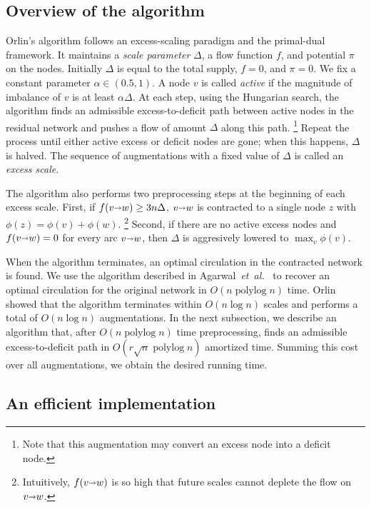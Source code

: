 \documentclass[a4paper,UKenglish]{socg-lipics-v2019}
\makeatletter
\def\etal{\emph{et~al.}}
\def\etal{\textit{et~al.}}
\def\polylog{\mathop{\mathrm{polylog}}}
\def\fsupply{\phi}
\def\arcto{\mathord\shortrightarrow}
\def\arc#1#2{#1\arcto#2}
\theoremstyle{plain}
\numberwithin{figure}{section}
\def\EMPH#1{\textcolor{BrickRed}{{\emph{#1}}}}
\def\n@te#1{\textsf{\boldmath \textbf{$\langle\!\langle$#1$\rangle\!\rangle$}}\leavevmode}
\def\note#1{\textcolor{red}{\n@te{#1}}}
\makeatother
\begin{document}
\subsection{Overview of the algorithm}

Orlin's algorithm follows an excess-scaling paradigm and the primal-dual framework.
It maintains a \EMPH{scale parameter} $\Delta$, a flow function $f$, and
potential $\pi$ on the nodes.
Initially $\Delta$ is equal to the total supply, $f = 0$, and $\pi = 0$.
We fix a constant parameter $\alpha \in (0.5, 1)$.
A node $v$ is called \EMPH{active} if the magnitude of imbalance of $v$ is at least $\alpha\Delta$.
At each step, using the Hungarian search, the algorithm finds an admissible
excess-to-deficit path between active nodes in the residual network and pushes a flow
of amount $\Delta$ along this path.%
\footnote{Note that this augmentation may convert an excess node into a deficit node.}
Repeat the process until either active excess or deficit nodes are gone; when this happens, $\Delta$ is halved.
The sequence of augmentations with a fixed value of $\Delta$ is called an
\EMPH{excess scale}.

The algorithm also performs two preprocessing steps at the beginning of each excess scale.
First, if $f(\arc vw) \geq 3n\Delta$, $\arc vw$ is contracted to a single node $z$ with
$\fsupply(z) = \fsupply(v) + \fsupply(w)$.%
\footnote{Intuitively, $f(\arc vw)$ is so high that future scales cannot deplete
the flow on $\arc vw$.}
Second, if there are no active excess nodes and $f(\arc vw) = 0$ for every arc $\arc vw$, then $\Delta$
is aggresively lowered to $\max_v \fsupply(v)$.

When the algorithm terminates, an optimal circulation in the
contracted network is found.
We use the algorithm described in Agarwal~\etal~\cite{AFPVX17arxiv} to recover
an optimal circulation for the original network in $O(n\polylog n)$ time.
Orlin showed that the algorithm terminates within $O(n\log n)$ scales and
performs a total of $O(n\log n)$ augmentations.
In the next subsection, we describe an algorithm that, after $O(n\polylog n)$ time
preprocessing,
finds an admissible excess-to-deficit path
in $O(r\sqrt{n} \polylog n)$ amortized time.
Summing this cost over all augmentations, we obtain the desired running time.

\subsection{An efficient implementation}
\end{document}
